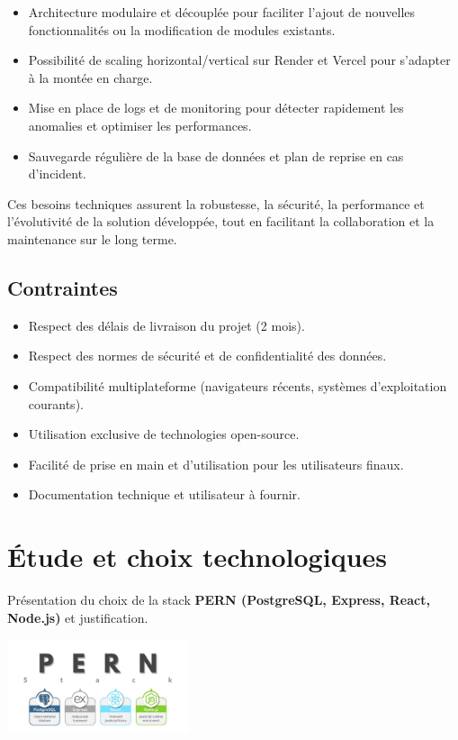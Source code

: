 \documentclass[12pt,a4paper]{report}
\begin{document}
\begin{itemize}
    \begin{itemize}
        \item Architecture modulaire et découplée pour faciliter l’ajout de nouvelles fonctionnalités ou la modification de modules existants.
        \item Possibilité de scaling horizontal/vertical sur Render et Vercel pour s’adapter à la montée en charge.
        \item Mise en place de logs et de monitoring pour détecter rapidement les anomalies et optimiser les performances.
        \item Sauvegarde régulière de la base de données et plan de reprise en cas d’incident.
    \end{itemize}
\end{itemize}

Ces besoins techniques assurent la robustesse, la sécurité, la performance et l’évolutivité de la solution développée, tout en facilitant la collaboration et la maintenance sur le long terme.

\section{Contraintes}

\begin{itemize}
    \item Respect des délais de livraison du projet (2 mois).
    \item Respect des normes de sécurité et de confidentialité des données.
    \item Compatibilité multiplateforme (navigateurs récents, systèmes d’exploitation courants).
    \item Utilisation exclusive de technologies open-source.
    \item Facilité de prise en main et d’utilisation pour les utilisateurs finaux.
    \item Documentation technique et utilisateur à fournir.
\end{itemize}

\chapter{Étude et choix technologiques}

Présentation du choix de la stack \textbf{PERN (PostgreSQL, Express, React, Node.js)} et justification.  

\begin{center}
    \includegraphics[width=0.4\textwidth]{1_ptqverAyBpdfUDhrs2g_3A.jpg} %
\end{center}
\end{document}
